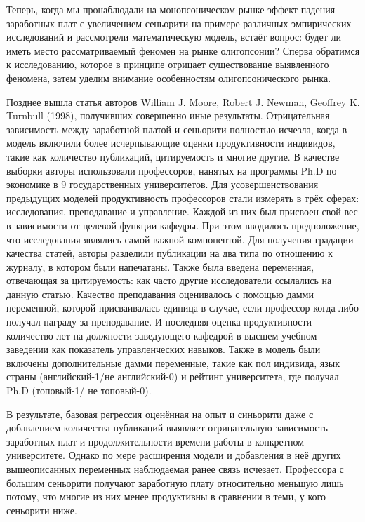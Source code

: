 \documentclass[a4paper, 12pt]{article}
\theoremstyle{definition}
\theoremstyle{plain}
\begin{document}
	Теперь, когда мы пронаблюдали на монопсоническом рынке эффект падения заработных плат с увеличением сеньорити на примере различных эмпирических исследований и рассмотрели математическую модель, встаёт вопрос: будет ли иметь место рассматриваемый феномен на рынке олигопсонии? Сперва обратимся к исследованию, которое в принципе отрицает существование выявленного феномена, затем уделим внимание особенностям олигопсонического рынка.
	
	Позднее вышла статья авторов William J. Moore, Robert J. Newman, Geoffrey K. Turnbull (1998), получивших совершенно иные результаты. Отрицательная зависимость  между заработной платой и сеньорити полностью исчезла, когда в модель включили более исчерпывающие оценки продуктивности индивидов, такие как количество публикаций, цитируемость и многие другие. В качестве выборки авторы использовали профессоров, нанятых на программы Ph.D по экономике в 9 государственных университетов. Для усовершенствования предыдущих моделей продуктивность профессоров стали измерять в трёх сферах: исследования, преподавание и управление. Каждой из них был присвоен свой вес в зависимости от целевой функции кафедры. При этом вводилось предположение, что  исследования являлись самой важной компонентой. Для получения градации качества статей, авторы разделили публикации на два типа по отношению к журналу, в котором были напечатаны. Также была введена переменная, отвечающая за цитируемость: как часто другие исследователи ссылались на данную статью. Качество преподавания оценивалось с помощью дамми переменной, которой присваивалась единица в случае, если профессор когда-либо получал награду за преподавание. И последняя оценка продуктивности - количество лет на должности заведующего кафедрой в высшем учебном заведении как показатель управленческих навыков. Также в модель были включены дополнительные дамми переменные, такие как пол индивида, язык страны (английский-1/не английский-0) и рейтинг университета, где получал Ph.D (топовый-1/ не топовый-0). 
	
	В результате, базовая регрессия оценённая на опыт и синьорити даже с добавлением количества публикаций выявляет отрицательную зависимость заработных плат и продолжительности времени работы в конкретном университете. Однако по мере расширения модели и добавления в неё других вышеописанных переменных наблюдаемая ранее связь исчезает. Профессора с большим сеньорити получают заработную плату относительно меньшую лишь потому, что многие из них менее продуктивны в сравнении в теми, у кого сеньорити ниже.
	
\end{document}
